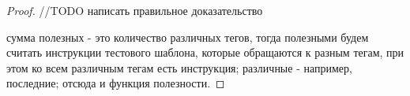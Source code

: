 \begin{proof}
//TODO написать правильное доказательство

сумма полезных - это количество различных тегов, тогда полезными будем считать инструкции тестового шаблона, которые обращаются к разным тегам, при этом ко всем различным тегам есть инструкция; различные - например, последние; отсюда и функция полезности.

\end{proof}

